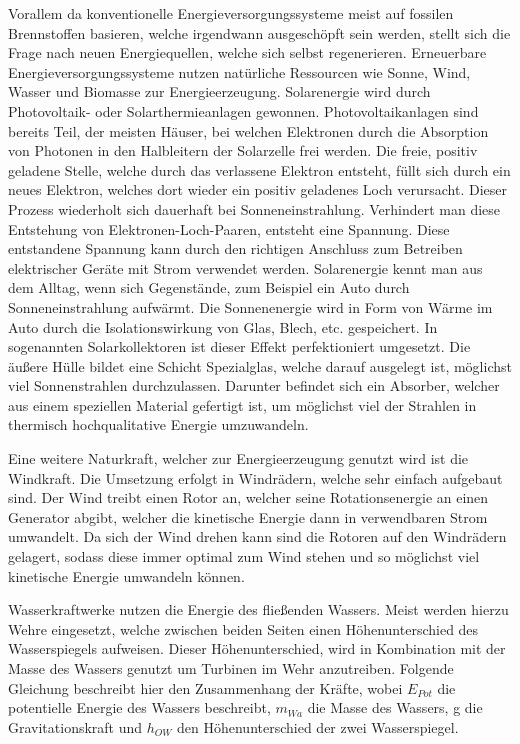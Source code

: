 Vorallem da konventionelle Energieversorgungssysteme meist auf fossilen
Brennstoffen basieren, welche irgendwann ausgeschöpft sein werden, stellt sich
die Frage nach neuen Energiequellen, welche sich selbst regenerieren.
Erneuerbare Energieversorgungssysteme nutzen natürliche Ressourcen wie Sonne,
Wind, Wasser und Biomasse zur Energieerzeugung. Solarenergie wird durch
Photovoltaik- oder Solarthermieanlagen gewonnen. Photovoltaikanlagen sind
bereits Teil, der meisten Häuser, bei welchen Elektronen durch die Absorption
von Photonen in den Halbleitern der Solarzelle frei werden. Die freie, positiv
geladene Stelle, welche durch das verlassene Elektron entsteht, füllt sich
durch ein neues Elektron, welches dort wieder ein positiv geladenes Loch
verursacht. Dieser Prozess wiederholt sich dauerhaft bei Sonneneinstrahlung.
Verhindert man diese Entstehung von Elektronen-Loch-Paaren, entsteht eine
Spannung. Diese entstandene Spannung kann durch den richtigen Anschluss zum
Betreiben elektrischer Geräte mit Strom verwendet
werden.\cite{renner2010grundlagen} Solarenergie kennt man aus dem Alltag, wenn
sich Gegenstände, zum Beispiel ein Auto durch Sonneneinstrahlung aufwärmt. Die
Sonnenenergie wird in Form von Wärme im Auto durch die Isolationswirkung von
Glas, Blech, etc. gespeichert. In sogenannten Solarkollektoren ist dieser
Effekt perfektioniert umgesetzt. Die äußere Hülle bildet eine Schicht
Spezialglas, welche darauf ausgelegt ist, möglichst viel Sonnenstrahlen
durchzulassen. Darunter befindet sich ein Absorber, welcher aus einem
speziellen Material gefertigt ist, um möglichst viel der Strahlen in thermisch
hochqualitative Energie umzuwandeln.\cite{schabbach2014solarthermie}

Eine weitere Naturkraft, welcher zur Energieerzeugung genutzt wird ist die
Windkraft. Die Umsetzung erfolgt in Windrädern, welche sehr einfach aufgebaut
sind. Der Wind treibt einen Rotor an, welcher seine Rotationsenergie an einen
Generator abgibt, welcher die kinetische Energie dann in verwendbaren Strom
umwandelt. Da sich der Wind drehen kann sind die Rotoren auf den Windrädern
gelagert, sodass diese immer optimal zum Wind stehen und so möglichst viel
kinetische Energie umwandeln können.\cite{osterhage2015windkraft}

Wasserkraftwerke nutzen die Energie des fließenden Wassers. Meist werden hierzu
Wehre eingesetzt, welche zwischen beiden Seiten einen Höhenunterschied des
Wasserspiegels aufweisen. Dieser Höhenunterschied, wird in Kombination mit der
Masse des Wassers genutzt um Turbinen im Wehr anzutreiben. Folgende Gleichung
beschreibt hier den Zusammenhang der Kräfte, wobei $E_{Pot}$ die potentielle
Energie des Wassers beschreibt, $m_{Wa}$ die Masse des Wassers, g die
Gravitationskraft und $h_{OW}$ den Höhenunterschied der zwei Wasserspiegel.

